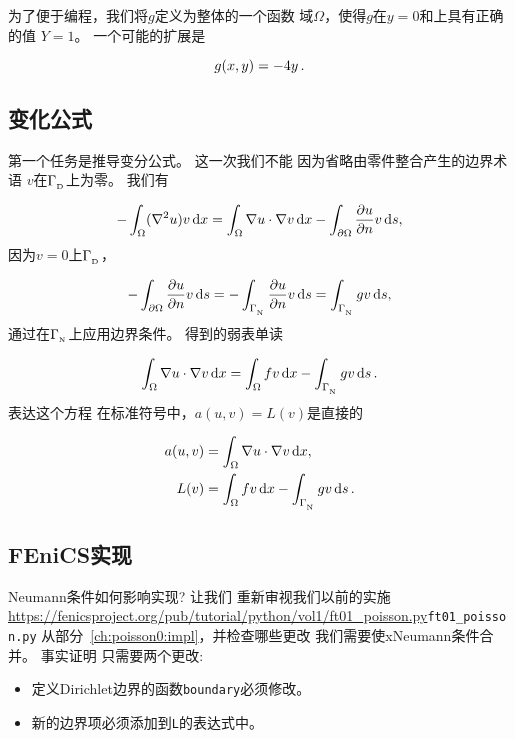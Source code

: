 为了便于编程，我们将$g$定义为整体的一个函数
域$\Omega$，使得$g$在$y=0$和上具有正确的值
$Y=1$。 一个可能的扩展是

\begin{equation*}
g(x,y) = -4y\tp
\end{equation*}

\subsection{变化公式}

第一个任务是推导变分公式。 这一次我们不能
因为省略由零件整合产生的边界术语
$v$在$\GD$上为零。 我们有

\begin{equation*}
 -\int_\Omega (\nabla^2 u)v \dx
= \int_\Omega\nabla u\cdot\nabla v \dx - \int_{\partial\Omega}{\partial u\over
\partial n}v \ds,
\end{equation*}
因为$v=0$上$\GD$，

\begin{equation*}
- \int_{\partial\Omega}{\partial u\over
\partial n}v \ds
=
- \int_{\GN}{\partial u\over
\partial n}v \ds
= \int_{\GN}gv \ds,
\end{equation*}
通过在$\GN$上应用边界条件。
得到的弱表单读

\begin{equation}
\int_{\Omega} \nabla u \cdot \nabla v \dx
= \int_{\Omega} fv \dx - \int_{\GN} gv \ds\tp
\label{ch:poisson0:2D:DN:weak}
\end{equation}
表达这个方程
在标准符号中，$a(u,v)=L(v)$是直接的

\begin{align}
a(u, v) &= \int_{\Omega} \nabla u \cdot \nabla v \dx,
\label{ftut:poisson2:vard:a}\\
L(v) &= \int_{\Omega} fv \dx -
\int_{\GN} gv \ds\tp  \label{ftut:poisson2:vard:L}
\end{align}

\subsection{FEniCS实现}

Neumann条件如何影响实现? 让我们
重新审视我们以前的实施
\url{https://fenicsproject.org/pub/tutorial/python/vol1/ft01_poisson.py}{\nolinkurl{ft01_poisson.py}}
从部分~\ref{ch:poisson0:impl}，并检查哪些更改
我们需要使xNeumann条件合并。 事实证明
只需要两个更改:

\begin{itemize}
  \item 定义Dirichlet边界的函数\texttt{boundary}必须修改。

  \item 新的边界项必须添加到\texttt{L}的表达式中。
\end{itemize}


